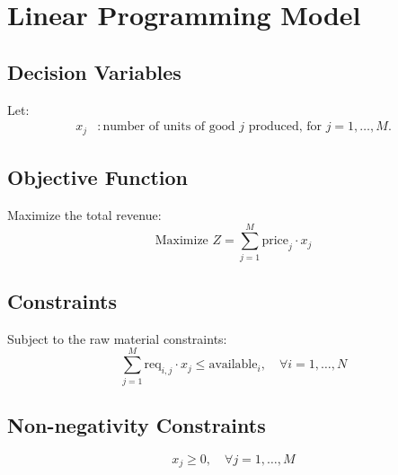 \documentclass{article}
\begin{document}
\section*{Linear Programming Model}

\subsection*{Decision Variables}
Let:
\begin{align*}
x_j & : \text{number of units of good } j \text{ produced, for } j = 1, \ldots, M.
\end{align*}

\subsection*{Objective Function}
Maximize the total revenue:
\[
\text{Maximize } Z = \sum_{j=1}^{M} \text{price}_j \cdot x_j
\]

\subsection*{Constraints}
Subject to the raw material constraints:
\[
\sum_{j=1}^{M} \text{req}_{i,j} \cdot x_j \leq \text{available}_i, \quad \forall i = 1, \ldots, N
\]

\subsection*{Non-negativity Constraints}
\[
x_j \geq 0, \quad \forall j = 1, \ldots, M
\]
\end{document}
